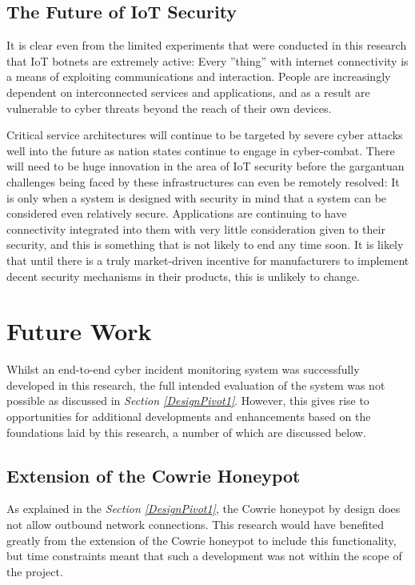 \subsection{The Future of IoT Security}

It is clear even from the limited experiments that were conducted in this research that IoT botnets are extremely active: Every ''thing'' with internet connectivity is a means of exploiting communications and interaction. People are increasingly dependent on interconnected services and applications, and as a result are vulnerable to cyber threats beyond the reach of their own devices. 

Critical service architectures will continue to be targeted by severe cyber attacks well into the future as nation states continue to engage in cyber-combat. There will need to be huge innovation in the area of IoT security before the gargantuan challenges being faced by these infrastructures can even be remotely resolved: It is only when a system is designed with security in mind that a system can be considered even relatively secure. Applications are continuing to have connectivity integrated into them with very little consideration given to their security, and this is something that is not likely to end any time soon. It is likely that until there is a truly market-driven incentive for manufacturers to implement decent security mechanisms in their products, this is unlikely to change.


%
% 
\section{Future Work} \label{FutureWork}
Whilst an end-to-end cyber incident monitoring system was successfully developed in this research, the full intended evaluation of the system was not possible as discussed in \textit{Section \ref{DesignPivot1}}. However, this gives rise to opportunities for additional developments and enhancements based on the foundations laid by this research, a number of which are discussed below.


\subsection{Extension of the Cowrie Honeypot} \label{ExtendingCowrie}

As explained in the \textit{Section \ref{DesignPivot1}}, the Cowrie honeypot by design does not allow outbound network connections. This research would have benefited greatly from the extension of the Cowrie honeypot to include this functionality, but time constraints meant that such a development was not within the scope of the project. 


